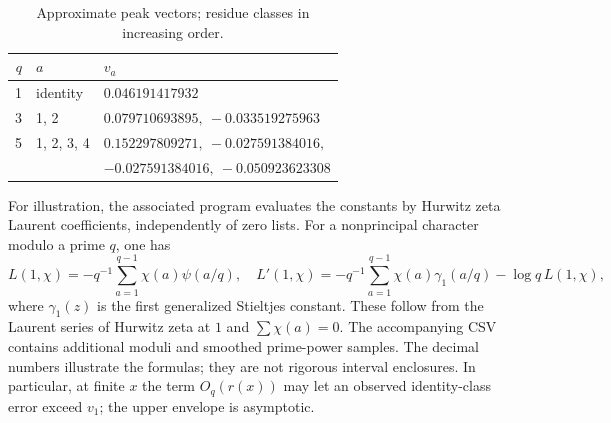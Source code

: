 \documentclass[11pt]{article}
\theoremstyle{remark}\newtheorem{remark}[theorem]{Remark}
\begin{document}
\begin{table}[ht]
\centering
\caption{Approximate peak vectors; residue classes in increasing order.}\label{tab:examples}
\begin{tabular}{rll}
\toprule
$q$ & $a$ & $v_a$\\\midrule
1 & identity & $0.046191417932$\\
3 & 1, 2 & $0.079710693895,\ -0.033519275963$\\
5 & 1, 2, 3, 4 & $0.152297809271,\ -0.027591384016,$\\
  & & $-0.027591384016,\ -0.050923623308$\\
\bottomrule
\end{tabular}
\end{table}
For illustration, the associated program evaluates the constants by Hurwitz zeta Laurent coefficients, independently of zero lists. For a nonprincipal character modulo a prime $q$, one has
\[
 L(1,\chi)=-q^{-1}\sum_{a=1}^{q-1}\chi(a)\psi(a/q),\quad
 L'(1,\chi)=-q^{-1}\sum_{a=1}^{q-1}\chi(a)\gamma_1(a/q)-\log q\,L(1,\chi),
\]
where $\gamma_1(z)$ is the first generalized Stieltjes constant. These follow from the Laurent series of Hurwitz zeta at $1$ and $\sum\chi(a)=0$. The accompanying CSV contains additional moduli and smoothed prime-power samples. The decimal numbers illustrate the formulas; they are not rigorous interval enclosures. In particular, at finite $x$ the term $O_q(r(x))$ may let an observed identity-class error exceed $v_1$; the upper envelope is asymptotic.
\end{document}
